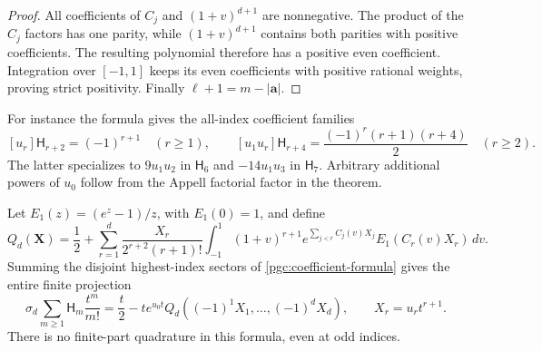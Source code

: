 \begin{proof}
All coefficients of $C_j$ and $(1+v)^{d+1}$ are nonnegative.
The product of the $C_j$ factors has one parity, while $(1+v)^{d+1}$
contains both parities with positive coefficients. The resulting
polynomial therefore has a positive even coefficient. Integration over
$[-1,1]$ keeps its even coefficients with positive rational weights,
proving strict positivity. Finally $\ell+1=m-|\boldsymbol a|$.
\end{proof}

For instance the formula gives the all-index coefficient families
\begin{equation}\label{pgc:linear-mixed}
 [u_r]\mathsf H_{r+2}=(-1)^{r+1}\quad(r\ge1),\qquad
 [u_1u_r]\mathsf H_{r+4}=\frac{(-1)^r(r+1)(r+4)}2\quad(r\ge2).
\end{equation}
The latter specializes to $9u_1u_2$ in $\mathsf H_6$ and
$-14u_1u_3$ in $\mathsf H_7$. Arbitrary additional powers of $u_0$
follow from the Appell factorial factor in the theorem.

Let $E_1(z)=(e^z-1)/z$, with $E_1(0)=1$, and define
\begin{equation}\label{pgc:ordinary}
 Q_d(\mathbf X)=\frac12+
 \sum_{r=1}^d\frac{X_r}{2^{r+2}(r+1)!}
 \int_{-1}^1(1+v)^{r+1}e^{\sum_{j<r}C_j(v)X_j}
                                  E_1(C_r(v)X_r)\,dv.
\end{equation}
Summing the disjoint highest-index sectors of
\eqref{pgc:coefficient-formula} gives the entire finite projection
\begin{equation}\label{pgc:projection}
 \sigma_d\sum_{m\ge1}\mathsf H_m\frac{t^m}{m!}
 =\frac t2-t e^{u_0t}Q_d((-1)^1X_1,\ldots,(-1)^dX_d),
 \qquad X_r=u_rt^{r+1}.
\end{equation}
There is no finite-part quadrature in this formula, even at odd indices.

